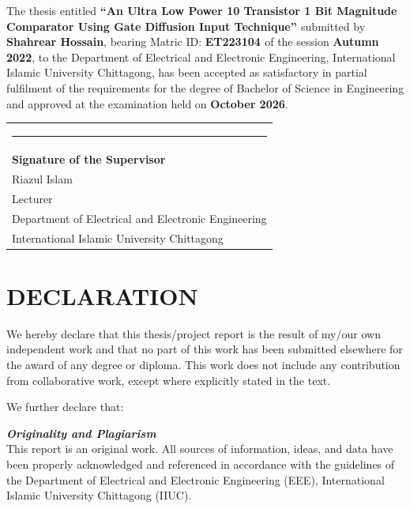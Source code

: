 \documentclass[12pt,a4paper,oneside]{report}
\begin{document}
\noindent The thesis entitled {\bfseries{``An Ultra Low Power 10 Transistor 1 Bit Magnitude Comparator Using Gate Diffusion
Input Technique'' }} submitted by {\bfseries{Shahrear Hossain}}, bearing Matric ID: {\bfseries{ET223104 }} of the session {\bfseries {Autumn 2022}}, to the Department of Electrical and Electronic Engineering, International Islamic University Chittagong, has been accepted as satisfactory in partial fulfilment of the requirements for the degree of Bachelor of Science in Engineering and approved at the examination held on {\bfseries{October 2026}}.

\vspace{0.6cm}

\noindent

\vspace{0.8cm}

\noindent
\begin{tabular}{l}
    \rule{6cm}{0.4pt} \\[0.2cm]
    \textbf{Signature of the Supervisor} \\[0.2cm]
    Riazul Islam \\
    Lecturer \\
    Department of Electrical and Electronic Engineering \\
    International Islamic University Chittagong
\end{tabular}

\clearpage

\chapter*{DECLARATION}

\noindent We hereby declare that this thesis/project report is the result of my/our own independent work and that no part of this work has been submitted elsewhere for the award of any degree or diploma. This work does not include any contribution from collaborative work, except where explicitly stated in the text.

\vspace{0.15cm}
\noindent We further declare that:

\vspace{0.15cm}
\noindent\textbf{\textit{Originality and Plagiarism}}\\
This report is an original work. All sources of information, ideas, and data have been properly acknowledged and referenced in accordance with the guidelines of the Department of Electrical and Electronic Engineering (EEE), International Islamic University Chittagong (IIUC).
\end{document}
